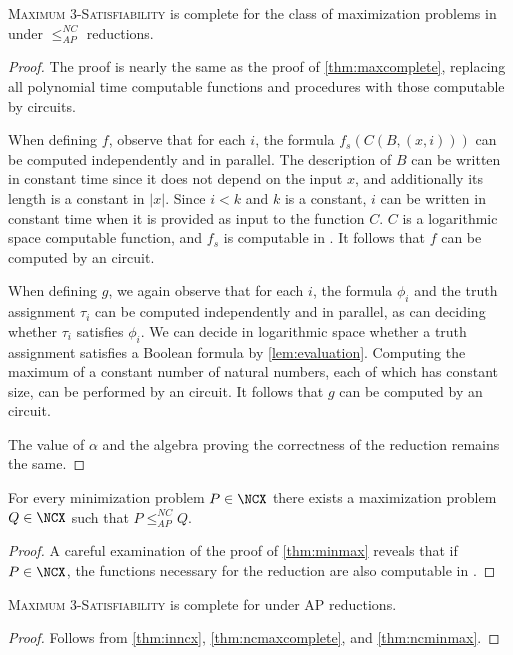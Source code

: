 \documentclass[]{article}
\newcommand{\NCAPr}{\leq_{AP}^{NC}}
\begin{document}
\begin{theorem}\label{thm:ncmaxcomplete}
  \textsc{Maximum 3-Satisfiability} is complete for the class of maximization problems in \NCX{} under $\NCAPr$ reductions.
\end{theorem}
\begin{proof}
  The proof is nearly the same as the proof of \autoref{thm:maxcomplete}, replacing all polynomial time computable functions and procedures with those computable by \NC{} circuits.

  When defining $f$, observe that for each $i$, the formula $f_s(C(B, (x, i)))$ can be computed independently and in parallel.
  The description of $B$ can be written in constant time since it does not depend on the input $x$, and additionally its length is a constant in $|x|$.
  Since $i < k$ and $k$ is a constant, $i$ can be written in constant time when it is provided as input to the function $C$.
  $C$ is a logarithmic space computable function, and $f_s$ is computable in \NC.
  It follows that $f$ can be computed by an \NC{} circuit.

  When defining $g$, we again observe that for each $i$, the formula $\phi_i$ and the truth assignment $\tau_i$ can be computed independently and in parallel, as can deciding whether $\tau_i$ satisfies $\phi_i$.
  We can decide in logarithmic space whether a truth assignment satisfies a Boolean formula by \autoref{lem:evaluation}.
  Computing the maximum of a constant number of natural numbers, each of which has constant size, can be performed by an \NC{} circuit.
  It follows that $g$ can be computed by an \NC{} circuit.

  The value of $\alpha$ and the algebra proving the correctness of the reduction remains the same.
\end{proof}

\begin{theorem}\label{thm:ncminmax}
  For every minimization problem $P \in \NCX$ there exists a maximization problem $Q \in \NCX$ such that $P \NCAPr Q$.
\end{theorem}
\begin{proof}
  A careful examination of the proof of \autoref{thm:minmax} reveals that if $P \in \NCX$, the functions necessary for the reduction are also computable in \NC.
\end{proof}

\begin{corollary}
  \textsc{Maximum 3-Satisfiability} is complete for \NCX{} under \NC{} AP reductions.
\end{corollary}
\begin{proof}
  Follows from \autoref{thm:inncx}, \autoref{thm:ncmaxcomplete}, and \autoref{thm:ncminmax}.
\end{proof}
\end{document}
